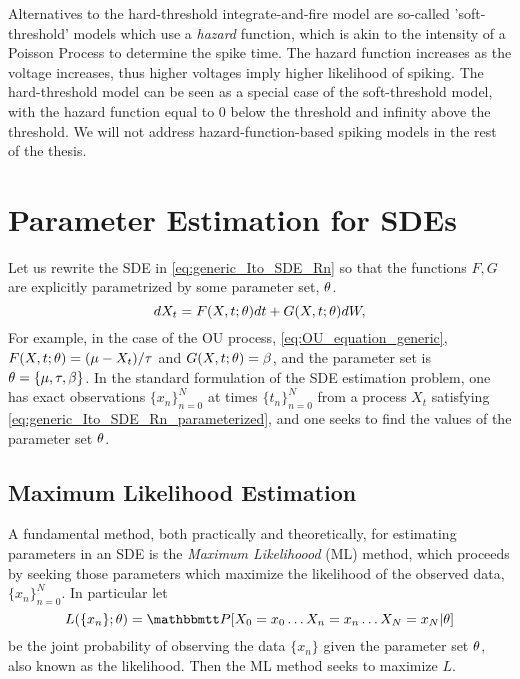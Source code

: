 Alternatives to the hard-threshold integrate-and-fire model are so-called
'soft-threshold' models which use a {\sl hazard} function, which is akin to the
intensity of a Poisson Process to determine the spike time. The hazard function
increases as the voltage increases, thus higher voltages imply higher likelihood of
spiking. The hard-threshold model can be seen as a special case of the
soft-threshold model, with the hazard function equal to 0 below the threshold
and infinity above the threshold. We will not address hazard-function-based
spiking models in the rest of the thesis. 

\section{Parameter Estimation for SDEs}
\label{sec:estimation}
Let us rewrite the SDE in \cref{eq:generic_Ito_SDE_Rn} so that the 
functions $F, G$ are explicitly parametrized by some parameter set, ${ \theta}$.
\begin{equation}
dX_t = F(X,t;{ \theta}) dt + G(X,t;{ \theta}) dW,
\label{eq:generic_Ito_SDE_Rn_parameterized}
\end{equation}
For example, in the case of the OU process, \cref{eq:OU_equation_generic},
$F(X,t;{ \theta}) = ({\mu } - {X_t})/{{ \tau }}$ and $G(X,t;{ \theta}) = \beta$, and the
parameter set is ${ \theta} = \{{\mu }, { \tau }, \beta\}$. In the standard formulation of the SDE estimation problem,  
one has exact observations $\{x_n\}_{n=0}^N$ at times $\{t_n\}_{n=0}^N$ from a process $X_t$
satisfying \cref{eq:generic_Ito_SDE_Rn_parameterized}, and one seeks to find the
values of the parameter set ${ \theta}$.

\subsection{Maximum Likelihood Estimation}
A fundamental method, both
practically and theoretically, for estimating parameters in an SDE is the {\sl Maximum
Likelihoood} (ML) method, which proceeds by seeking those parameters which
maximize the likelihood of the observed data, $\{x_n\}_{n=0}^N$. In particular
let $$L(\{x_n\}; \th) = \Prob[ X_0 = x_0\ldots X_n = x_n\ldots X_N = x_N |
\th]$$ be the joint probability of observing the data $\{x_n\}$ given the
parameter set ${ \theta}$, also known as the likelihood. Then the ML method seeks to
maximize $L$.

